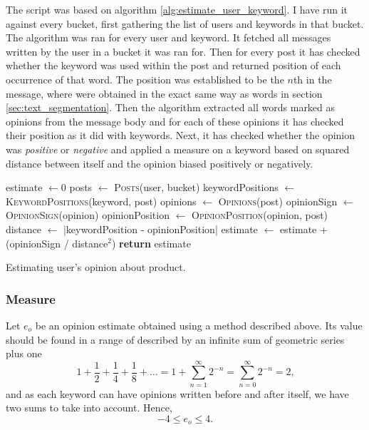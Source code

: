     The script was based on algorithm \ref{alg:estimate_user_keyword}. I have run it against every bucket, first gathering the list of users and keywords in that bucket.
    The algorithm was ran for every user and keyword. It fetched all messages written by the user in a bucket it was ran for. Then for every post it has checked whether the keyword was used within the post and returned position of each occurrence of that word. The position was established to be the $n$th  in the message, where  were obtained in the exact same way as words in section \ref{sec:text_segmentation}. Then the algorithm extracted all words marked as opinions from the message body and for each of these opinions it has checked their position as it did with keywords. Next, it has checked whether the opinion was \emph{positive} or \emph{negative} and applied a measure on a keyword based on squared distance between itself and the opinion biased positively or negatively.
    \begin{algorithm}[H]
      \begin{algorithmic}[1]
          \State estimate $\gets 0$
          \State posts $\gets$ \textsc{Posts}(user, bucket)
            \State keywordPositions $\gets$ \textsc{KeywordPositions}(keyword, post)
              \State opinions $\gets$ \textsc{Opinions}(post)
                \State opinionSign $\gets$ \textsc{OpinionSign}(opinion)
                \State opinionPosition $\gets$ \textsc{OpinionPosition}(opinion, post)
                \State distance $\gets$ |keywordPosition - opinionPosition|
                \State estimate $\gets$ estimate + (opinionSign / distance$^2$)
              \EndFor
            \EndFor
          \EndFor
          \State \textbf{return} estimate
        \EndProcedure
      \end{algorithmic}
      \caption{Estimating user's opinion about product.}
      \label{alg:estimate_user_keyword}
    \end{algorithm}

    \subsubsection{Measure}

      Let $e_o$ be an opinion estimate obtained using a method described above. Its value should be found in a range of described by an infinite sum of geometric series plus one
      \begin{equation}
        1 + \frac{1}{2} + \frac{1}{4} + \frac{1}{8} + \ldots = 1 + \sum_{n=1}^{\infty} 2^{-n} = \sum_{n=0}^{\infty} 2^{-n} = 2 \mbox{,}
      \end{equation}
      and as each keyword can have opinions written before and after itself, we have two sums to take into account. Hence,
      \begin{equation}
        -4 \leq e_o \leq 4 \mbox{.}
      \end{equation}
      

